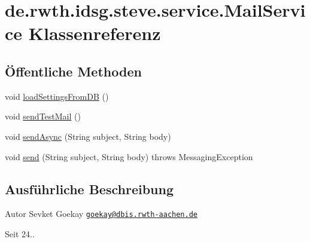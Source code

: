 \hypertarget{classde_1_1rwth_1_1idsg_1_1steve_1_1service_1_1_mail_service}{\section{de.\+rwth.\+idsg.\+steve.\+service.\+Mail\+Service Klassenreferenz}
\label{classde_1_1rwth_1_1idsg_1_1steve_1_1service_1_1_mail_service}
}
\subsection*{Öffentliche Methoden}
\begin{DoxyCompactItemize}
\item 
void \hyperlink{classde_1_1rwth_1_1idsg_1_1steve_1_1service_1_1_mail_service_a94249ec39b6fc5b6c8e7e8d34176e4d6}{load\+Settings\+From\+D\+B} ()
\item 
void \hyperlink{classde_1_1rwth_1_1idsg_1_1steve_1_1service_1_1_mail_service_aaf445960dcd0526a5b60fbf254c5c3e0}{send\+Test\+Mail} ()
\item 
void \hyperlink{classde_1_1rwth_1_1idsg_1_1steve_1_1service_1_1_mail_service_afc047efa2824599a183f26097e8df068}{send\+Async} (String subject, String body)
\item 
void \hyperlink{classde_1_1rwth_1_1idsg_1_1steve_1_1service_1_1_mail_service_aa6c424efad003ade5bf5c13b938a7d83}{send} (String subject, String body)  throws Messaging\+Exception 
\end{DoxyCompactItemize}


\subsection{Ausführliche Beschreibung}
\begin{DoxyAuthor}{Autor}
Sevket Goekay \href{mailto:goekay@dbis.rwth-aachen.de}{\tt goekay@dbis.\+rwth-\/aachen.\+de} 
\end{DoxyAuthor}
\begin{DoxySince}{Seit}
24.. 
\end{DoxySince}


